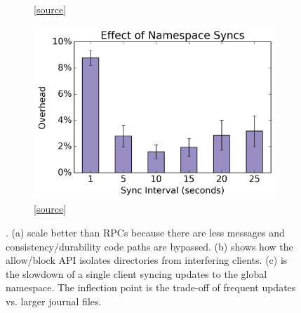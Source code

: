 \begin{figure}[tb]
\begin{subfigure}[b]{.3\linewidth}
      \caption{
      [\href{https://github.com/michaelsevilla/cudele-popper/blob/master/experiments/cudele-blockapi/visualize/viz.ipynb}{source}]
      }\label{fig:block-allow}
  \end{subfigure}
  \begin{subfigure}[b]{.3\linewidth}
      \centering
      \includegraphics[width=1.0\linewidth]{graphs/slowdown-sync.png}
      \caption{
      [\href{https://github.com/michaelsevilla/cudele-popper/blob/master/experiments/cudele-partialreads/visualize/viz.ipynb}{source}]
      }\label{fig:slowdown-sync}
  \end{subfigure}
\caption{. (a)  scale better than RPCs because there
are less messages and consistency/durability code paths are bypassed. (b) shows
how the allow/block API isolates directories from interfering clients. (c) is
the slowdown of a single client syncing updates to the global namespace. The
inflection point is the trade-off of frequent updates vs. larger journal
files.}
\label{fig:use-cases}
\end{figure}

